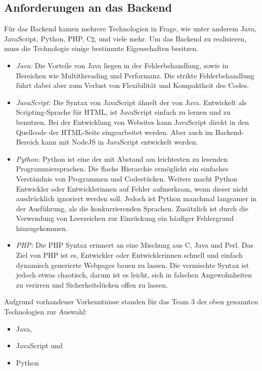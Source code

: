 \subsection{Anforderungen an das Backend}
Für das Backend kamen mehrere Technologien in Frage, wie unter anderem Java, JavaScript, Python, PHP, C$\sharp$, und viele mehr.
Um das Backend zu realisieren, muss die Technologie einige bestimmte Eigenschaften besitzen.\cite{CompareBackendLanguage}
\begin{itemize}
    \item \textit{Java:}
    \subitem Die Vorteile von Java liegen in der Fehlerbehandlung, sowie in Bereichen wie Multithreading und Performanz. Die strikte Fehlerbehandlung führt dabei aber zum Verlust von Flexibilität und Kompaktheit des Codes.
    \item \textit{JavaScript:}
    \subitem Die Syntax von JavaScript ähnelt der von Java. Entwickelt als Scripting-Sprache für HTML, ist JavaScript einfach zu lernen und zu benutzen. Bei der Entwicklung von Websites kann JavaScript direkt in den Quellcode der HTML-Seite eingearbeitet werden. Aber auch im Backend-Bereich kann mit NodeJS in JavaScript entwickelt werden.
    \item \textit{Python:}
    \subitem Python ist eine der mit Abstand am leichtesten zu lesenden Programmiersprachen. Die flache Hierarchie ermöglicht ein einfaches Verständnis von Programmen und Codestücken. Weiters macht Python Entwickler oder Entwicklerinnen auf Fehler aufmerksam, wenn dieser nicht ausdrücklich ignoriert werden soll.
    Jedoch ist Python manchmal langsamer in der Ausführung, als die konkurrierenden Sprachen. Zusätzlich ist durch die Verwendung von Leerzeichen zur Einrückung ein häufiger Fehlergrund hinzugekommen.
    \item \textit{PHP:}
    \subitem Die PHP Syntax erinnert an eine Mischung aus C, Java und Perl. Das Ziel von PHP ist es, Entwickler oder Entwicklerinnen schnell und einfach dynamisch generierte Webpages bauen zu lassen. Die vermischte Syntax ist jedoch etwas chaotisch, darum ist es leicht, sich in falschen Angewohnheiten zu verirren und Sicherheitslücken offen zu lassen.
  \end{itemize}
  Aufgrund vorhandener Vorkenntnisse standen für das Team 3 der oben genannten Technologien zur Auswahl:

  \begin{itemize}
    \item Java,
    \item JavaScript und
    \item Python
  \end{itemize}

